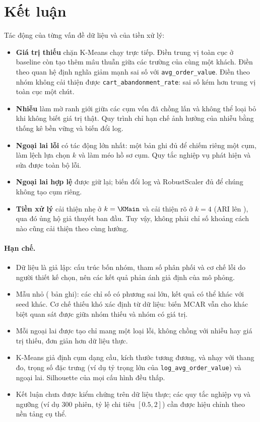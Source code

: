 \documentclass[11pt,a4paper]{article}
\begin{document}
\section{Kết luận}

Tác động của từng vấn đề dữ liệu và của tiền xử lý:
\begin{itemize}
  \item \textbf{Giá trị thiếu} chặn K-Means chạy trực tiếp. Điền trung vị toàn cục ở baseline còn tạo thêm mâu thuẫn giữa các trường của cùng một khách. Điền theo quan hệ định nghĩa giảm mạnh sai số với \texttt{avg\_order\_value}. Điền theo nhóm không cải thiện được \texttt{cart\_abandonment\_rate}: sai số kém hơn trung vị toàn cục một chút.
  \item \textbf{Nhiễu} làm mờ ranh giới giữa các cụm vốn đã chồng lấn và không thể loại bỏ khi không biết giá trị thật. Quy trình chỉ hạn chế ảnh hưởng của nhiễu bằng thống kê bền vững và biến đổi log.
  \item \textbf{Ngoại lai lỗi} có tác động lớn nhất: một bản ghi đủ để chiếm riêng một cụm, làm lệch lựa chọn $k$ và làm méo hồ sơ cụm. Quy tắc nghiệp vụ phát hiện và sửa được toàn bộ \OutlierError{} lỗi.
  \item \textbf{Ngoại lai hợp lệ} được giữ lại; biến đổi log và RobustScaler đủ để chúng không tạo cụm riêng.
  \item \textbf{Tiền xử lý} cải thiện nhẹ ở $k=\KMain$ và cải thiện rõ ở $k=4$ (ARI \AriKfourA{} lên \AriKfourB), qua đó ủng hộ giả thuyết ban đầu. Tuy vậy, không phải chỉ số khoảng cách nào cũng cải thiện theo cùng hướng.
\end{itemize}

\paragraph{Hạn chế.}
\begin{itemize}
  \item Dữ liệu là giả lập: cấu trúc bốn nhóm, tham số phân phối và cơ chế lỗi do người thiết kế chọn, nên các kết quả phản ánh giả định của mô phỏng.
  \item Mẫu nhỏ (\NCustomers{} bản ghi): các chỉ số có phương sai lớn, kết quả có thể khác với seed khác. Cơ chế thiếu khó xác định từ dữ liệu: biến MCAR vẫn cho khác biệt quan sát được giữa nhóm thiếu và nhóm có giá trị.
  \item Mỗi ngoại lai được tạo chỉ mang một loại lỗi, không chồng với nhiễu hay giá trị thiếu, đơn giản hơn dữ liệu thực.
  \item K-Means giả định cụm dạng cầu, kích thước tương đương, và nhạy với thang đo, trọng số đặc trưng (ví dụ tỷ trọng lớn của \texttt{log\_avg\_order\_value}) và ngoại lai. Silhouette của mọi cấu hình đều thấp.
  \item Kết luận chưa được kiểm chứng trên dữ liệu thực; các quy tắc nghiệp vụ và ngưỡng (ví dụ 300 phiên, tỷ lệ chi tiêu $[0.5, 2]$) cần được hiệu chỉnh theo nền tảng cụ thể.
\end{itemize}
\end{document}
